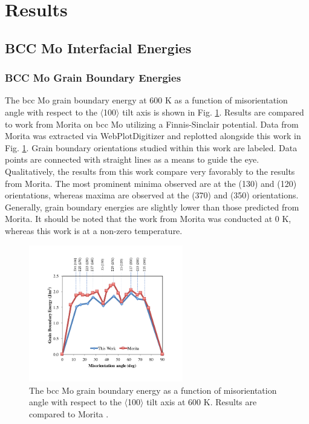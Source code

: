 \documentclass[review]{elsarticle}
\begin{document}
\section{Results}
\subsection{BCC Mo Interfacial Energies}

\subsubsection{BCC Mo Grain Boundary Energies}

The bcc Mo grain boundary energy at 600 K as a function of misorientation angle with respect to the $\langle$100$\rangle$ tilt axis is shown in Fig. \ref{fig:mo600}. Results are compared to work from Morita \cite{morita1997} on bcc Mo utilizing a Finnis-Sinclair \cite{finnis} potential. Data from Morita \cite{morita1997} was extracted via WebPlotDigitizer \cite{webplot} and replotted alongside this work in Fig. \ref{fig:mo600}. Grain boundary orientations studied within this work are labeled. Data points are connected with straight lines as a means to guide the eye. Qualitatively, the results from this work compare very favorably to the results from Morita. The most prominent minima observed are at the (130) and (120) orientations, whereas maxima are observed at the (370) and (350) orientations. Generally, grain boundary energies are slightly lower than those predicted from Morita. It should be noted that the work from Morita was conducted at 0 K, whereas this work is at a non-zero temperature. 

\begin{figure}[h]
 \centering
 \includegraphics[width=0.6\textwidth]{mo600B.png} 
 \caption{The bcc Mo grain boundary energy as a function of misorientation angle with respect to the $\langle$100$\rangle$ tilt axis at 600 K. Results are compared to Morita \cite{morita1997}.}
 \label{fig:mo600}
\end{figure}
\end{document}
